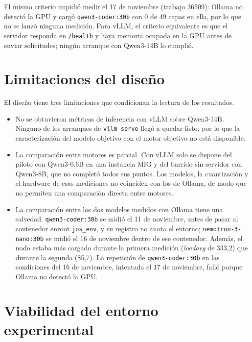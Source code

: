 El mismo criterio impidió medir el 17 de noviembre (trabajo 36509): Ollama no detectó la GPU y cargó \texttt{qwen3-\allowbreak coder:\allowbreak 30b} con 0 de 49 capas en ella, por lo que no se lanzó ninguna medición. Para vLLM, el criterio equivalente es que el servidor responda en \texttt{/health} y haya memoria ocupada en la GPU antes de enviar solicitudes; ningún arranque con Qwen3-14B lo cumplió.

\section{Limitaciones del diseño}
\label{sec:cap3:limitaciones}

El diseño tiene tres limitaciones que condicionan la lectura de los resultados.

\begin{itemize}
  \item No se obtuvieron métricas de inferencia con vLLM sobre Qwen3-14B. Ninguno de los arranques de \texttt{vllm serve} llegó a quedar listo, por lo que la caracterización del modelo objetivo con el motor objetivo no está disponible.
  \item La comparación entre motores es parcial. Con vLLM solo se dispone del piloto con Qwen3-0.6B en una instancia MIG y del barrido sin servidor con Qwen3-8B, que no completó todos sus puntos. Los modelos, la cuantización y el hardware de esas mediciones no coinciden con los de Ollama, de modo que no permiten una comparación directa entre motores.
  \item La comparación entre los dos modelos medidos con Ollama tiene una salvedad. \texttt{qwen3-\allowbreak coder:\allowbreak 30b} se midió el 11 de noviembre, antes de pasar al contenedor enroot \texttt{jos\_env}, y su registro no anota el entorno; \texttt{nemotron-3-\allowbreak nano:\allowbreak 30b} se midió el 16 de noviembre dentro de ese contenedor. Además, el nodo estaba más cargado durante la primera medición (\textit{loadavg} de 333,2) que durante la segunda (85,7). La repetición de \texttt{qwen3-\allowbreak coder:\allowbreak 30b} en las condiciones del 16 de noviembre, intentada el 17 de noviembre, falló porque Ollama no detectó la GPU.
\end{itemize}


\section{Viabilidad del entorno experimental}
\label{sec:cap3:viabilidad}

